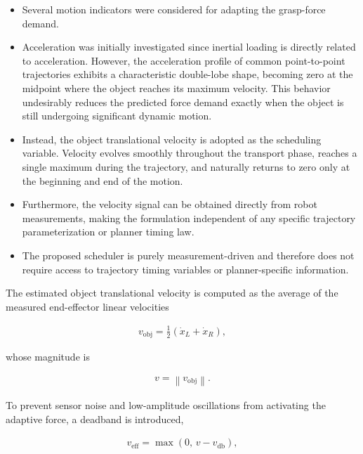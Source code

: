 \documentclass[conference]{IEEEtran}
\begin{document}
\begin{itemize}

    \item Several motion indicators were considered for adapting the grasp-force demand.

    \item Acceleration was initially investigated since inertial loading is directly related to acceleration. However, the acceleration profile of common point-to-point trajectories exhibits a characteristic double-lobe shape, becoming zero at the midpoint where the object reaches its maximum velocity. This behavior undesirably reduces the predicted force demand exactly when the object is still undergoing significant dynamic motion.

    \item Instead, the object translational velocity is adopted as the scheduling variable. Velocity evolves smoothly throughout the transport phase, reaches a single maximum during the trajectory, and naturally returns to zero only at the beginning and end of the motion.

    \item Furthermore, the velocity signal can be obtained directly from robot measurements, making the formulation independent of any specific trajectory parameterization or planner timing law.
    \item The proposed scheduler is purely measurement-driven and therefore does not require access to trajectory timing variables or planner-specific information.
\end{itemize}

The estimated object translational velocity is computed as the average of the measured end-effector linear velocities

\begin{align}
v_{\mathrm{obj}}
=
\frac{1}{2}
\left(
\dot{x}_L+\dot{x}_R
\right),
\end{align}

whose magnitude is

\begin{align}
v
=
\left\|
v_{\mathrm{obj}}
\right\|.
\end{align}

To prevent sensor noise and low-amplitude oscillations from activating the adaptive force, a deadband is introduced,

\begin{align}
v_{\mathrm{eff}}
=
\max\left(0,\,
v-v_{\mathrm{db}}
\right),
\end{align}
\end{document}
